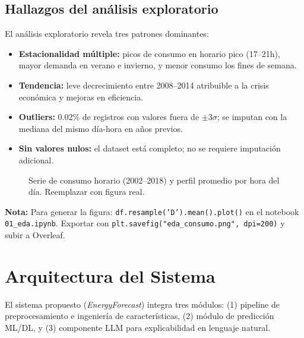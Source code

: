 \documentclass[10pt,twocolumn]{article}
\newcommand{\nota}[1]{%
  \vspace{4pt}
  \noindent\colorbox{eafitblue!8}{%
    \begin{minipage}{\columnwidth-2\fboxsep}
      \small\color{eafitblue!80}\textbf{Nota:} #1
    \end{minipage}
  }
  \vspace{4pt}
}
\begin{document}
\subsection{Hallazgos del análisis exploratorio}

El análisis exploratorio revela tres patrones dominantes:

\begin{itemize}[leftmargin=*,topsep=2pt,itemsep=1pt]
  \item \textbf{Estacionalidad múltiple:} picos de consumo en
    horario pico (17--21h), mayor demanda en verano e invierno,
    y menor consumo los fines de semana.
  \item \textbf{Tendencia:} leve decrecimiento entre 2008--2014
    atribuible a la crisis económica y mejoras en eficiencia.
  \item \textbf{Outliers:} 0.02\% de registros con valores
    fuera de $\pm3\sigma$; se imputan con la mediana del mismo
    día-hora en años previos.
  \item \textbf{Sin valores nulos:} el dataset está completo;
    no se requiere imputación adicional.
\end{itemize}

\begin{figure}[H]
  \centering
  \fbox{\rule{0pt}{2.8cm}\rule{\columnwidth-2\fboxsep}{0pt}}
  \caption{Serie de consumo horario (2002--2018) y perfil
           promedio por hora del día. Reemplazar con figura real.}
  \label{fig:eda}
\end{figure}

\nota{Para generar la figura: \texttt{df.resample('D').mean().plot()}
  en el notebook \texttt{01\_eda.ipynb}. Exportar con
  \texttt{plt.savefig("eda\_consumo.png", dpi=200)} y subir a Overleaf.}

\section{Arquitectura del Sistema}

El sistema propuesto (\textit{EnergyForecast}) integra tres
módulos: (1) pipeline de preprocesamiento e ingeniería de
características, (2) módulo de predicción ML/DL, y (3)
componente LLM para explicabilidad en lenguaje natural.
\end{document}
